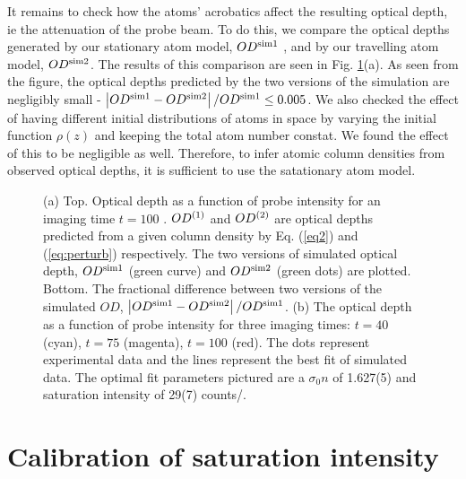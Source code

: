 It remains to check how the atoms' acrobatics affect the resulting optical depth, ie the attenuation of the probe beam. To do this, we compare the optical depths generated by our stationary atom model,  $OD^{\rm{sim1}}$ , and by our travelling atom model, $OD^{\rm{sim2}}$. The results of this comparison are seen in Fig. \ref{fig:compareModelsAndIsat}(a). As seen from the figure, the optical depths predicted by the two versions of the simulation are negligibly small -  $\left|OD^{\rm{sim1}}-OD^{\rm{sim2}}\right|/OD^{\rm{sim1}} \le 0.005$. We also checked the effect of having different initial distributions of atoms in space by varying the initial function $\rho(z)$ and keeping the total atom number constat. We found the effect of this to be negligible as well. Therefore, to infer atomic column densities from observed optical depths, it is sufficient to use the satationary atom model.



\begin{figure}
\caption{(a) Top. Optical depth as a function of probe intensity for an imaging time $t=100$ \us. $OD^{\rm{(1)}}$ and $OD^{\rm{(2)}}$ are optical depths predicted from a given column density by Eq. (\ref{eq2}) and (\ref{eq:perturb}) respectively.  The two versions of simulated optical depth, $OD^{\rm{sim1}}$ (green curve) and $OD^{\rm{sim2}}$ (green dots) are plotted. Bottom. The fractional difference between two versions of the simulated $OD$, $\left|OD^{\rm{sim1}}-OD^{\rm{sim2}}\right|/OD^{\rm{sim1}}$. (b) The optical depth as a function of probe intensity for three imaging times: $t=40$ \us{} (cyan),  $t=75$ \us{} (magenta),  $t=100$ \us{} (red). The dots represent experimental data and the lines represent the best fit of simulated data. The optimal fit parameters pictured are a $\sigma_0 n$ of 1.627(5) and saturation intensity of 29(7) counts/\us{}.}
\label{fig:compareModelsAndIsat}
\end{figure}


\section{Calibration of saturation intensity}

